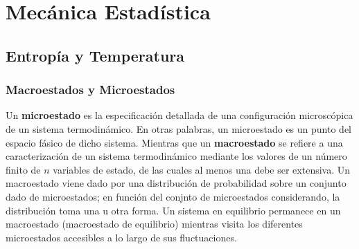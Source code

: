 \part{Mecánica Estadística}

\chapter{Entropía y Temperatura}

\section{Macroestados y Microestados}

Un \textbf{microestado} es la especificación detallada de una configuración microscópica de un sistema termodinámico. En otras palabras, un microestado es un punto del espacio fásico de dicho sistema. Mientras que un \textbf{macroestado} se refiere a una caracterización de un sistema termodinámico mediante los valores de un número finito de $n$ variables de estado, de las cuales al menos una debe ser extensiva. Un macroestado viene dado por una distribución de probabilidad sobre un conjunto dado de microestados; en función del conjnto de microestados considerando, la distribución toma una u otra forma. Un sistema en equilibrio permanece en un macroestado (macroestado de equilibrio) mientras visita los diferentes microestados accesibles a lo largo de sus fluctuaciones.